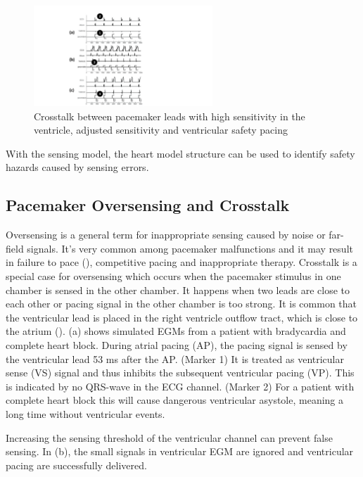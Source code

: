 \begin{figure}[t]
\center
		\includegraphics[width=0.6\textwidth]{figs/crosstalk_all.pdf}
\caption{Crosstalk between pacemaker leads with high sensitivity in the ventricle, adjusted sensitivity and ventricular safety pacing}
\label{fig:crosstalk}
\end{figure}
With the sensing model, the heart model structure can be used to identify safety hazards caused by sensing errors.
\subsection{Pacemaker Oversensing and Crosstalk}
Oversensing is a general term for inappropriate sensing caused by noise or far-field signals.
 It's very common among pacemaker malfunctions and it may result in failure to pace (\cite{med2, leads}), competitive pacing and inappropriate therapy. 
Crosstalk is a special case for oversensing which occurs when the pacemaker stimulus in one chamber is sensed in the other chamber. 
It happens when two leads are close to each other or pacing signal in the other chamber is too strong. 
It is common that the ventricular lead is placed in the right ventricle outflow tract, which is close to the atrium (\cite{icd}). 
(a) shows simulated EGMs from a patient with bradycardia and complete heart block. During atrial pacing (AP), the pacing signal is sensed by the ventricular lead 53 ms after the AP. (Marker 1) 
It is treated as ventricular sense (VS) signal and thus inhibits the subsequent ventricular pacing (VP). 
This is indicated by no QRS-wave in the ECG channel. (Marker 2) For a patient with complete heart block this will cause dangerous ventricular asystole, meaning a long time without ventricular events.  

Increasing the sensing threshold of the ventricular channel can prevent false sensing. 
In (b), the small signals in ventricular EGM are ignored and ventricular pacing are successfully delivered. 



